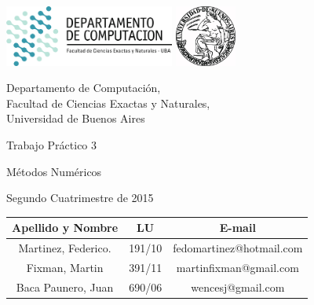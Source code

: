 \documentclass[a4paper, 10pt, twoside]{article}
\newcommand{\titulo}{Trabajo Práctico 3}
\newcommand{\materia}{Métodos Numéricos}
\newcommand{\cuatrimestre}{Segundo Cuatrimestre de 2015}
\begin{document}


\thispagestyle{caratula}

\begin{center}

\includegraphics[height=2cm]{DC.png}
\hfill
\includegraphics[height=2cm]{UBA.jpg}

\vspace{2cm}

Departamento de Computación,\\
Facultad de Ciencias Exactas y Naturales,\\
Universidad de Buenos Aires

\vspace{4cm}

\begin{Huge}
\titulo
\end{Huge}

\vspace{0.5cm}

\begin{Large}
\materia
\end{Large}

\vspace{1cm}

\cuatrimestre

\vspace{4cm}

\begin{tabular}{|c|c|c|}
\hline
Apellido y Nombre & LU & E-mail\\
\hline
Martinez, Federico.  & 191/10 &  fedomartinez@hotmail.com\\
Fixman, Martin      & 391/11 & martinfixman@gmail.com\\
Baca Paunero, Juan & 690/06 & wencesj@gmail.com\\
\hline
\end{tabular}

\end{center}
\end{document}
